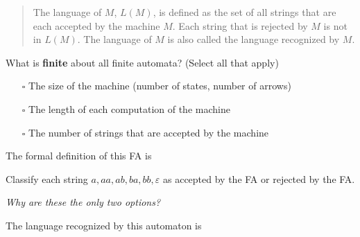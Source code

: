 \documentclass[12pt, oneside]{article}
\begin{document}
\begin{quote} 
The language of $M$, $L(M)$, is defined as the set of  all strings that are each accepted 
by the machine $M$. Each string that is rejected by $M$ is not in $L(M)$.
The language of $M$ is also called the language recognized by $M$.
\end{quote}   
   
What is {\bf finite} about all finite automata? (Select all that apply)
\begin{itemize}
   \item[$\square$] The size of the machine (number of states, number of arrows)
   \item[$\square$] The length of each computation of the machine
   \item[$\square$] The number of strings that are accepted by the machine
\end{itemize}
\newpage
  
\begin{center}
\end{center}
The formal definition of this FA is
   
\vfill
\vfill
   

Classify each string $a, aa, ab, ba, bb, \varepsilon$ as accepted by the FA or rejected by the FA.  

{\it Why are these the only two options?}

\vspace{200pt}


The language recognized by this automaton is
  

\vfill
\end{document}
